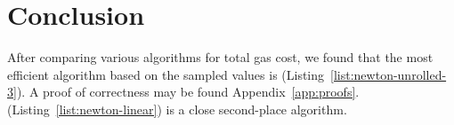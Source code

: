 \section{Conclusion}

After comparing various algorithms for total gas cost,
we found that the most efficient algorithm based on the sampled values is
\UnrolledThree{} (Listing~\ref{list:newton-unrolled-3}).
A proof of correctness may be found Appendix~\ref{app:proofs}.
\Linear{} (Listing~\ref{list:newton-linear}) is a close second-place algorithm.
